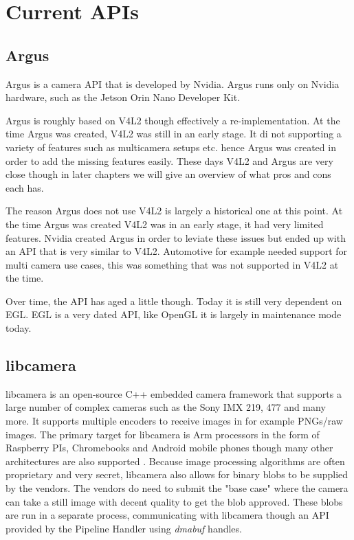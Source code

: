 \chapter{Current APIs\label{section:currentAPIs}}
\section{Argus}

Argus is a camera API that is developed by Nvidia. Argus runs only on Nvidia
hardware, such as the Jetson Orin Nano Developer Kit.

Argus is roughly based on V4L2 though effectively a re-implementation. At the
time Argus was created, V4L2 was still in an early stage. It di not supporting
a variety of features such as multicamera setups etc. hence Argus was created
in order to add the missing features easily. These days V4L2 and Argus are very
close though in later chapters we will give an overview of what pros and cons
each has.

The reason Argus does not use V4L2 is largely a historical one at this point.
At the time Argus was created V4L2 was in an early stage, it had very limited
features. Nvidia created Argus in order to leviate these issues but ended up
with an API that is very similar to V4L2. Automotive for example needed support
for multi camera use cases, this was something that was not supported in V4L2 at
the time.

Over time, the API has aged a little though. Today it is still very dependent on
EGL. EGL is a very dated API, like OpenGL it is largely in maintenance mode
today.

\section{libcamera}
libcamera is an open-source C++ embedded camera framework that supports a large
number of complex cameras such as the Sony IMX 219, 477 and many more. It
supports multiple encoders to receive images in for example PNGs/raw images.
The primary target for libcamera is Arm processors in the form of Raspberry
PIs, Chromebooks and Android mobile phones though many other architectures are
also supported \cite{libcameraStack}. Because image processing algorithms are
often proprietary and very secret, libcamera also allows for binary blobs to be
supplied by the vendors. The vendors do need to submit the "base case" where
the camera can take a still image with decent quality to get the blob approved.
These blobs are run in a separate process, communicating with libcamera though
an API provided by the Pipeline Handler using \textit{dmabuf} handles.

